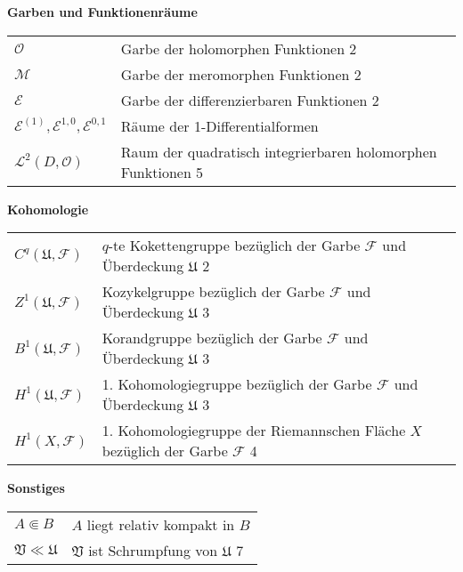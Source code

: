 \documentclass[11pt,a4paper,toc=bibliography]{scrartcl}
\theoremstyle{thm}
\theoremstyle{def}
\theoremstyle{remark}
\begin{document}

\textbf{Garben und Funktionenräume}

\begin{longtable}{p{3.5cm} p{12cm}}
$\mathcal{O}$ & Garbe der holomorphen Funktionen  2\\
$\mathcal{M}$ & Garbe der meromorphen Funktionen  2\\
$\mathcal{E}$ & Garbe der differenzierbaren Funktionen  2\\
$\mathcal{E}^{(1)},\mathcal{E}^{1,0},\mathcal{E}^{0,1}$ & Räume der 1-Differentialformen\\
$\mathcal{L}^2(D,\mathcal{O})$ & Raum der quadratisch integrierbaren holomorphen Funktionen  5\\

\end{longtable}

\textbf{Kohomologie}

\begin{longtable}{p{3.5cm} p{12cm}}
$C^q(\mathfrak{U},\mathcal{F})$ & $q$-te Kokettengruppe bezüglich der Garbe $\mathcal{F}$ und Überdeckung $\mathfrak{U}$  2\\
$Z^1(\mathfrak{U},\mathcal{F})$ & Kozykelgruppe bezüglich der Garbe $\mathcal{F}$ und Überdeckung $\mathfrak{U}$  3\\
$B^1(\mathfrak{U},\mathcal{F})$ & Korandgruppe bezüglich der Garbe $\mathcal{F}$ und Überdeckung $\mathfrak{U}$  3\\
$H^1(\mathfrak{U},\mathcal{F})$ & 1. Kohomologiegruppe bezüglich der Garbe $\mathcal{F}$ und Überdeckung $\mathfrak{U}$  3\\
$H^1(X,\mathcal{F})$ & 1. Kohomologiegruppe der Riemannschen Fläche $X$ bezüglich der Garbe $\mathcal{F}$  4\\
\end{longtable}
\textbf{Sonstiges}
\begin{longtable}{p{3.5cm} p{12cm}}
$A\Subset B$ & $A$ liegt relativ kompakt in $B$\\
$\mathfrak{V}\ll\mathfrak{U}$ & $\mathfrak{V}$ ist Schrumpfung von $\mathfrak{U}$  7\\
\end{longtable}
\newpage


\end{document}
